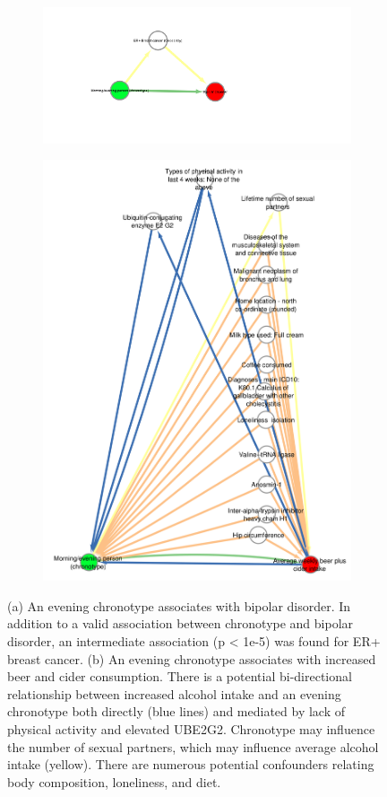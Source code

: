 \documentclass[journal,article,submit,moreauthors,pdftex]{Definitions/mdpi}
\begin{document}
\begin{figure}[htbp]
\begin{subfigure}{.5\linewidth}
\centering
	\includegraphics[width=0.9\linewidth,keepaspectratio]{Figs/Analysis3/morning_bipolar.png}
\caption{}
\label{chronoBipolar}
\end{subfigure}
\begin{subfigure}{.5\linewidth}
\centering
	\includegraphics[width=0.9\linewidth,keepaspectratio]{Figs/Analysis3/chronoBeer.png}
\caption{}
\label{chronoBeer}
\end{subfigure}
\caption{(a) An evening chronotype associates with bipolar disorder. In addition to a valid association between chronotype and bipolar disorder, an intermediate association (p < 1e-5) was found for ER+ breast cancer. (b) An evening chronotype associates with increased beer and cider consumption. There is a potential bi-directional relationship between increased alcohol intake and an evening chronotype both directly (blue lines) and mediated by lack of physical activity and elevated UBE2G2. Chronotype may influence the number of sexual partners, which may influence average alcohol intake (yellow). There are numerous potential confounders relating body composition, loneliness, and diet.}
\label{chronoBeerBipolar}
\end{figure}
\end{document}
